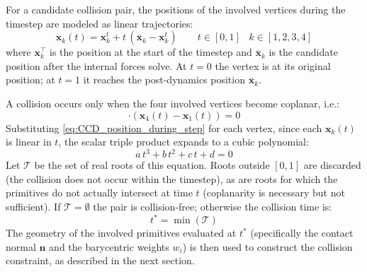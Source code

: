 \documentclass{article}
\begin{document}
For a candidate collision pair, the positions of the involved vertices during the timestep are modeled as linear trajectories:
\begin{equation}
\label{eq:CCD_position_during_step}
    \mathbf{x}_k(t) = \mathbf{x}_k^t + t\,(\bar{\mathbf{x}}_k - \mathbf{x}_k^t)
    \qquad
    t \in [0, 1] 
    \;\;\;
    k \in [1, 2, 3, 4]
\end{equation}
where $\mathbf{x}_k^\top$ is the position at the start of the timestep and $\bar{\mathbf{x}}_k$ is the candidate position after the internal forces solve. At $t=0$ the vertex is at its original position; at $t=1$ it reaches the post-dynamics position $\bar{\mathbf{x}}_k$.

A collision occurs only when the four involved vertices become coplanar, i.e.:
\begin{equation*}
[
    (\mathbf{x}_2(t) - \mathbf{x}_1(t)) \times 
    (\mathbf{x}_3(t) - \mathbf{x}_1(t))
] \cdot (\mathbf{x}_4(t) - \mathbf{x}_1(t)) = 0
\end{equation*}
Substituting \eqref{eq:CCD_position_during_step} for each vertex, since each $\mathbf{x}_k(t)$ is linear in $t$, the scalar triple product expands to a cubic polynomial:
\begin{equation*}
a\,t^3 + b\,t^2 + c\,t + d = 0
\end{equation*}
Let $\mathcal{T}$ be the set of real roots of this equation. Roots outside $[0,1]$ are discarded (the collision does not occur within the timestep), as are roots for which the primitives do not actually intersect at time $t$ (coplanarity is necessary but not sufficient). If $\mathcal{T} = \emptyset$ the pair is collision-free; otherwise the collision time is:
\begin{equation*}
    t^* = \min(\mathcal{T})
\end{equation*}
The geometry of the involved primitives evaluated at $t^*$ (specifically the contact normal $\mathbf{n}$ and the barycentric weights $w_i$) is then used to construct the collision constraint, as described in the next section.
\end{document}
